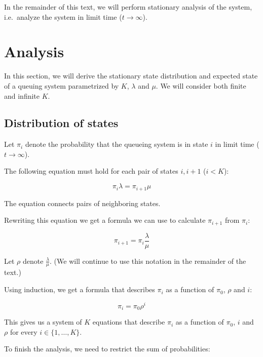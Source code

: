\documentclass{article}
\begin{document}
In the remainder of this text,
we will perform stationary analysis of the system,
i.e.~analyze the system in limit time ($t \rightarrow \infty$).

\section{Analysis}

In this section, we will derive the stationary state distribution
and expected state of a queuing system
parametrized by $K$, $\lambda$ and $\mu$.
We will consider both finite and infinite $K$.

\subsection{Distribution of states}


Let $\pi_i$ denote the probability that the queueing system
is in state $i$ in limit time ($t \rightarrow \infty$).

The following equation must hold for each pair of states
$i, i+1$ ($i < K$):

\begin{equation}
\pi_i \lambda = \pi_{i+1} \mu
\end{equation}

The equation connects pairs of neighboring states.

Rewriting this equation we get a formula we can use to calculate
$\pi_{i+1}$ from $\pi_i$:

\begin{equation}
\pi_{i+1} = \pi_i \frac{\lambda}{\mu}
\end{equation}

Let $\rho$ denote $\frac{\lambda}{\mu}$.
(We will continue to use this notation in the remainder of the text.)

Using induction, we get a formula that describes $\pi_i$
as a function of $\pi_0$, $\rho$ and $i$:

\begin{equation} \label{eqn:piifrompi0}
\pi_i = \pi_0 \rho^i
\end{equation}

This gives us a system of $K$ equations that describe
$\pi_i$ as a function of $\pi_0$, $i$ and $\rho$
for every $i \in \{1, \ldots, K\}$.

To finish the analysis, we need to restrict the sum of probabilities:
\end{document}

